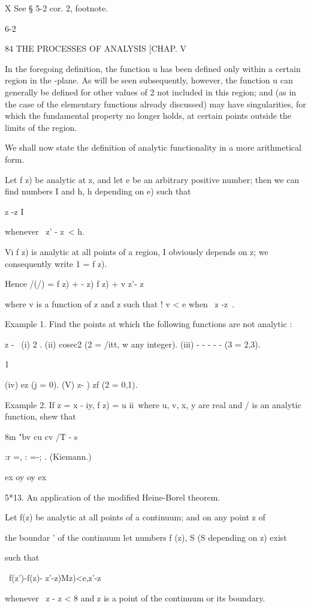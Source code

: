X See § 5-2 cor. 2, footnote.

6-2

84 THE PROCESSES OF ANALYSIS [CHAP. V

In the foregoing definition, the function u has been defined only
within a certain region in the -plane. As will be seen subsequently,
however, the function u can generally be defined for other values of 2
not included in this region; and (as in the case of the elementary
functions already discussed) may have singularities, for which the
fundamental property no longer holds, at certain points outside the
limits of the region.

We shall now state the definition of analytic functionality in a more
arithmetical form.

Let f z) be analytic at z, and let e be an arbitrary positive number;
then we can find numbers I and h, h depending on e) such that

z -z I

whenever \ z' - z\ < h.

Vi f z) is analytic at all points of a region, I obviously depends on
z; we consequently write 1 = f z).

Hence /(/) = f z) + - z) f z) + v z'- z\

where v is a function of z and z such that ! v < e when \ z -z\ < t>.

Example 1. Find the points at which the following functions are not
analytic :

z - \ (i) 2 . (ii) cosec2 (2 = /itt, w any integer). (iii) - - - - -
(3 = 2,3).

1

(iv) ez (j = 0). (V) z- ) zf (2 = 0,1).

Example 2. If z = x - iy, f z) = u ii\ where u, v, x, y are real and /
is an analytic function, shew that

8m "bv cu cv /T - s

 :r =, : =-; . (Kiemann.)

ex oy oy ex

5*13. An application of the modified Heine-Borel theorem.

Let f(z) be analytic at all points of a continuum; and on any point z
of

the boundar ' of the continuum let numbers f (z), S (S depending on z)
exist

such that

\ f(z')-f(z)- z'-z)Mz)<e,z'-z\

whenever \ z - z < 8 and z is a point of the continuum or its
boundary.

